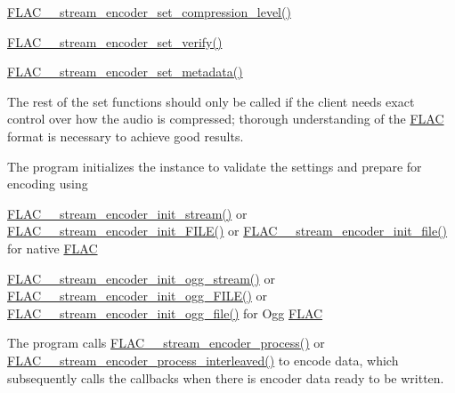 \begin{DoxyItemize}
\begin{DoxyItemize}
\item \hyperlink{group__flac__stream__encoder_ga03495bcd0aae71116c701b0dcf311c4b}{F\+L\+A\+C\+\_\+\+\_\+stream\+\_\+encoder\+\_\+set\+\_\+compression\+\_\+level()}
\item \hyperlink{group__flac__stream__encoder_ga5f4ac18a7207d2864fed72d284486f9e}{F\+L\+A\+C\+\_\+\+\_\+stream\+\_\+encoder\+\_\+set\+\_\+verify()}
\item \hyperlink{group__flac__stream__encoder_ga67b30b1a67a9274f7708a22154b225f6}{F\+L\+A\+C\+\_\+\+\_\+stream\+\_\+encoder\+\_\+set\+\_\+metadata()}
\end{DoxyItemize}
\item The rest of the set functions should only be called if the client needs exact control over how the audio is compressed; thorough understanding of the \hyperlink{namespace_f_l_a_c}{F\+L\+AC} format is necessary to achieve good results.
\item The program initializes the instance to validate the settings and prepare for encoding using
\begin{DoxyItemize}
\item \hyperlink{group__flac__stream__encoder_ga85221c4ceb9f22dfd4983d8f07a9a35b}{F\+L\+A\+C\+\_\+\+\_\+stream\+\_\+encoder\+\_\+init\+\_\+stream()} or \hyperlink{group__flac__stream__encoder_ga78653fea5d9bc490fff34e3ef86de944}{F\+L\+A\+C\+\_\+\+\_\+stream\+\_\+encoder\+\_\+init\+\_\+\+F\+I\+L\+E()} or \hyperlink{group__flac__stream__encoder_ga693bb5ed30d912822e0e6c7c0404428c}{F\+L\+A\+C\+\_\+\+\_\+stream\+\_\+encoder\+\_\+init\+\_\+file()} for native \hyperlink{namespace_f_l_a_c}{F\+L\+AC}
\item \hyperlink{group__flac__stream__encoder_ga87af71d74c09f7d482f9f420ef9bf826}{F\+L\+A\+C\+\_\+\+\_\+stream\+\_\+encoder\+\_\+init\+\_\+ogg\+\_\+stream()} or \hyperlink{group__flac__stream__encoder_gab44c7f51a61826e04abd8cdf5c1ceac2}{F\+L\+A\+C\+\_\+\+\_\+stream\+\_\+encoder\+\_\+init\+\_\+ogg\+\_\+\+F\+I\+L\+E()} or \hyperlink{group__flac__stream__encoder_ga51eb79f04e9a676cd1ce0c94729252e4}{F\+L\+A\+C\+\_\+\+\_\+stream\+\_\+encoder\+\_\+init\+\_\+ogg\+\_\+file()} for Ogg \hyperlink{namespace_f_l_a_c}{F\+L\+AC}
\end{DoxyItemize}
\item The program calls \hyperlink{group__flac__stream__encoder_gae187ec4f6cab3ca109637996ee23272d}{F\+L\+A\+C\+\_\+\+\_\+stream\+\_\+encoder\+\_\+process()} or \hyperlink{group__flac__stream__encoder_ga67c2ff5b23b945180797de420b1f27c0}{F\+L\+A\+C\+\_\+\+\_\+stream\+\_\+encoder\+\_\+process\+\_\+interleaved()} to encode data, which subsequently calls the callbacks when there is encoder data ready to be written.

\end{DoxyItemize}
